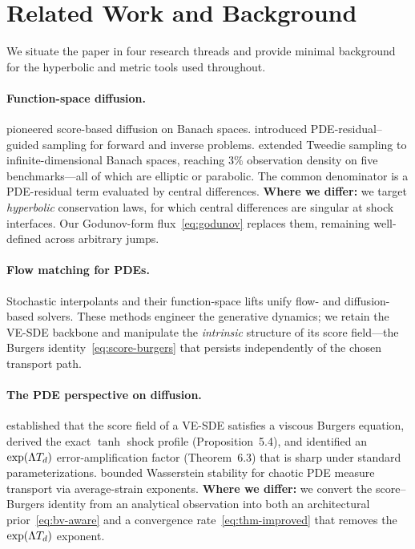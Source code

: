 %
\section{Related Work and Background}
\label{sec:related-bg}

We situate the paper in four research threads and provide minimal background for the hyperbolic and metric tools used throughout.

\paragraph{Function-space diffusion.}
\citet{lim2023ddo} pioneered score-based diffusion on Banach spaces. \citet{huang2024diffusionpde} introduced {PDE}-residual--guided sampling for forward and inverse problems. \citet{yao2025fundps} extended Tweedie sampling to infinite-dimensional Banach spaces, reaching $3\%$ observation density on five benchmarks---all of which are elliptic or parabolic. The common denominator is a {PDE}-residual term evaluated by central differences. \textbf{Where we differ:} we target \emph{hyperbolic} conservation laws, for which central differences are singular at shock interfaces. Our Godunov-form flux~\eqref{eq:godunov} replaces them, remaining well-defined across arbitrary jumps.

\paragraph{Flow matching for {PDE}s.}
Stochastic interpolants \citep{albergo2025interpolants} and their function-space lifts \citep{bhola2025fmo} unify flow- and diffusion-based solvers. These methods engineer the generative dynamics; we retain the {VE-SDE} backbone and manipulate the \emph{intrinsic} structure of its score field---the Burgers identity~\eqref{eq:score-burgers} that persists independently of the chosen transport path.

\paragraph{The {PDE} perspective on diffusion.}
\citet{sarkar2026scoreshocks} established that the score field of a {VE-SDE} satisfies a viscous Burgers equation, derived the exact $\tanh$ shock profile (Proposition~5.4), and identified an $\exp(\Lambda T_{d})$ error-amplification factor (Theorem~6.3) that is sharp under standard parameterizations. \citet{armegioiu2026chaotic} bounded Wasserstein stability for chaotic {PDE} measure transport via average-strain exponents. \textbf{Where we differ:} we convert the score--Burgers identity from an analytical observation into both an architectural prior~\eqref{eq:bv-aware} and a convergence rate~\eqref{eq:thm-improved} that removes the $\exp(\Lambda T_{d})$ exponent.

